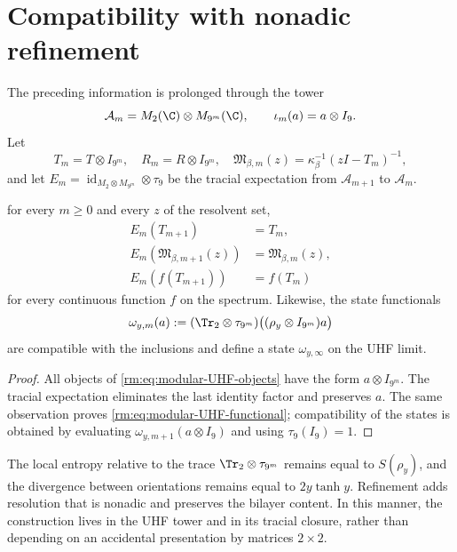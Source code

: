 \section{Compatibility with nonadic refinement}

The preceding information is prolonged through the tower
\begin{equation}
 \mathcal A_m=M_2(\C)\otimes M_{9^m}(\C),
 \qquad
 \iota_m(a)=a\otimes I_9.
 \label{rm:eq:modular-UHF-tower}
\end{equation}
Let
\begin{equation}
 T_m=T\otimes I_{9^m},
 \quad
 R_m=R\otimes I_{9^m},
 \quad
 \mathfrak M_{\beta,m}(z)
 =\kappa_\beta^{-1}(zI-T_m)^{-1},
 \label{rm:eq:modular-UHF-objects}
\end{equation}
and let
\(E_m=\operatorname{id}_{M_2\otimes M_{9^m}}\otimes\tau_9\) be the
tracial expectation from \(\mathcal A_{m+1}\) to \(\mathcal A_m\).

\begin{theorem}
\label{rm:thm:modular-UHF-naturality}
for every \(m\geq0\) and every \(z\) of the resolvent set,
\begin{align}
 E_m(T_{m+1})&=T_m,
 \label{rm:eq:modular-UHF-T}\\
 E_m\!\left(\mathfrak M_{\beta,m+1}(z)\right)
 &=\mathfrak M_{\beta,m}(z),
 \label{rm:eq:modular-UHF-resolvent}\\
 E_m\!\left(f(T_{m+1})\right)&=f(T_m)
 \label{rm:eq:modular-UHF-functional}
\end{align}
for every continuous function \(f\) on the spectrum. Likewise, the state functionals
\begin{equation}
 \omega_{y,m}(a)
 :=(\Tr_2\otimes\tau_{9^m})
 \bigl((\rho_y\otimes I_{9^m})a\bigr)
 \label{rm:eq:modular-UHF-state}
\end{equation}
are compatible with the inclusions and define a state \(\omega_{y,\infty}\)
on the UHF limit.
\end{theorem}

\begin{proof}
All objects of \cref{rm:eq:modular-UHF-objects} have the form
\(a\otimes I_{9^m}\). The tracial expectation eliminates the last identity
factor and preserves \(a\). The same observation proves
\cref{rm:eq:modular-UHF-functional}; compatibility of the states is
obtained by evaluating \(\omega_{y,m+1}(a\otimes I_9)\) and using
\(\tau_9(I_9)=1\).
\end{proof}

The local entropy relative to the trace
\(\Tr_2\otimes\tau_{9^m}\) remains equal to
\(S(\rho_y)\), and the divergence between orientations remains equal to
\(2y\tanh y\). Refinement adds resolution that is nonadic and preserves the
bilayer content. In this manner, the construction lives in the UHF tower and
in its tracial closure, rather than depending on an accidental presentation
by matrices \(2\times2\).

